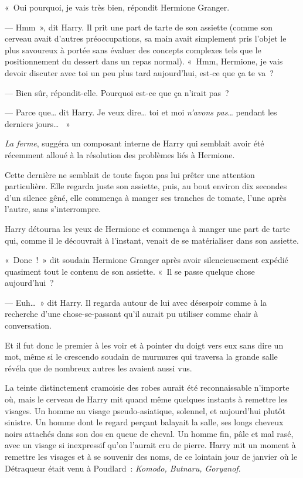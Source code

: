 «~Oui pourquoi, je vais très bien, répondit Hermione Granger.

--- Hmm~», dit Harry. Il prit une part de tarte de son assiette (comme son cerveau avait d'autres préoccupations, sa main avait simplement pris l'objet le plus savoureux à portée sans évaluer des concepts complexes tels que le positionnement du dessert dans un repas normal). «~Hmm, Hermione, je vais devoir discuter avec toi un peu plus tard aujourd'hui, est-ce que ça te va~?

--- Bien sûr, répondit-elle. Pourquoi est-ce que ça n'irait pas~?

--- Parce que… dit Harry. Je veux dire… toi et moi \emph{n'avons pas}… pendant les derniers jours… ~»

\emph{La ferme}, suggéra un composant interne de Harry qui semblait avoir été récemment alloué à la résolution des problèmes liés à Hermione.

Cette dernière ne semblait de toute façon pas lui prêter une attention particulière. Elle regarda juste son assiette, puis, au bout environ dix secondes d'un silence gêné, elle commença à manger ses tranches de tomate, l'une après l'autre, sans s'interrompre.

Harry détourna les yeux de Hermione et commença à manger une part de tarte qui, comme il le découvrait à l'instant, venait de se matérialiser dans son assiette.

«~Donc~!~» dit soudain Hermione Granger après avoir silencieusement expédié quasiment tout le contenu de son assiette. «~Il se passe quelque chose aujourd'hui~?

--- Euh…~» dit Harry. Il regarda autour de lui avec désespoir comme à la recherche d'une chose-se-passant qu'il aurait pu utiliser comme chair à conversation.

Et il fut donc le premier à les voir et à pointer du doigt vers eux sans dire un mot, même si le crescendo soudain de murmures qui traversa la grande salle révéla que de nombreux autres les avaient aussi vus.

La teinte distinctement cramoisie des robes aurait été reconnaissable n'importe où, mais le cerveau de Harry mit quand même quelques instants à remettre les visages. Un homme au visage pseudo-asiatique, solennel, et aujourd'hui plutôt sinistre. Un homme dont le regard perçant balayait la salle, ses longs cheveux noirs attachés dans son dos en queue de cheval. Un homme fin, pâle et mal rasé, avec un visage si inexpressif qu'on l'aurait cru de pierre. Harry mit un moment à remettre les visages et à se souvenir des noms, de ce lointain jour de janvier où le Détraqueur était venu à Poudlard~: \emph{Komodo, Butnaru, Goryanof}.

